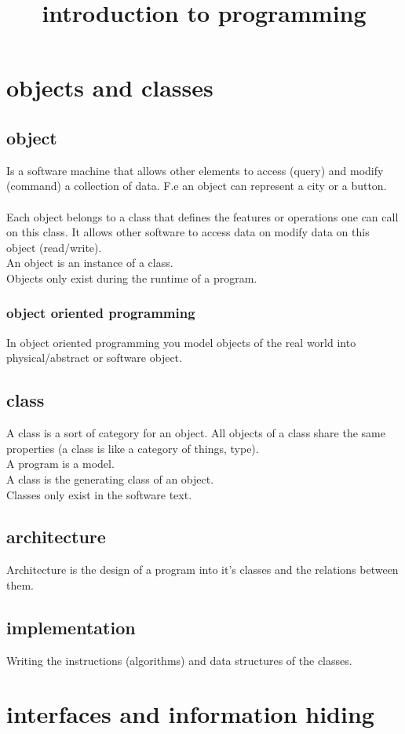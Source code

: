 \documentclass[11pt]{article}
\begin{document}
\title{introduction to programming}
\section{objects and classes}
\subsection{object}
Is a software machine that allows other elements to access (query) and modify (command) a collection of data. F.e an object can represent a city or a button.
\\\\Each object belongs to a class that defines the features or operations one can call on this class. It allows other software to access data on modify data on this object (read/write).
\\ An object is an instance of a class.
\\ Objects only exist during the runtime of a program.
\subsubsection{object oriented programming}
In object oriented programming you model objects of the real world into physical/abstract or software object.
\subsection{class}
A class is a sort of category for an object. All objects of a class share the same properties (a class is like a category of things, type).
\\ A program is a model.
\\ A class is the generating class of an object.
\\ Classes only exist in the software text.
\subsection{architecture}
Architecture is the design of a program into it's classes and the relations between them.
\subsection{implementation}
Writing the instructions (algorithms) and data structures of the classes.
\section{interfaces and information hiding}
\end{document}
